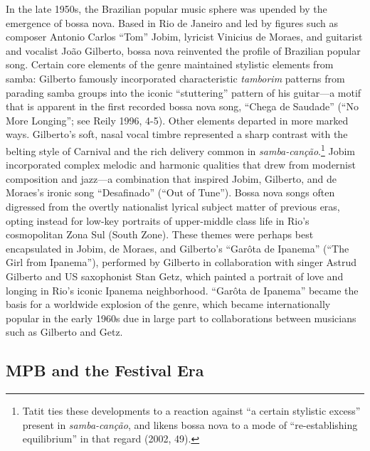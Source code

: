 \documentclass[twoside]{article}
\begin{document}
In the late 1950s, the Brazilian popular music sphere was upended by the
emergence of bossa nova. Based in Rio de Janeiro and led by figures such
as composer Antonio Carlos ``Tom'' Jobim, lyricist Vinicius de Moraes,
and guitarist and vocalist João Gilberto, bossa nova reinvented the
profile of Brazilian popular song. Certain core elements of the genre
maintained stylistic elements from samba: Gilberto famously incorporated
characteristic \emph{tamborim} patterns from parading samba groups into
the iconic ``stuttering'' pattern of his guitar---a motif that is
apparent in the first recorded bossa nova song, ``Chega de Saudade''
(``No More Longing''; see Reily 1996, 4-5). Other elements departed in
more marked ways. Gilberto's soft, nasal vocal timbre represented a
sharp contrast with the belting style of Carnival and the rich delivery
common in \emph{samba-canção}.\footnote{Tatit ties these developments to
  a reaction against ``a certain stylistic excess'' present in
  \emph{samba-canção}, and likens bossa nova to a mode of
  ``re-establishing equilibrium'' in that regard (2002, 49).} Jobim
incorporated complex melodic and harmonic qualities that drew from
modernist composition and jazz---a combination that inspired Jobim,
Gilberto, and de Moraes's ironic song ``Desafinado'' (``Out of Tune'').
Bossa nova songs often digressed from the overtly nationalist lyrical
subject matter of previous eras, opting instead for low-key portraits of
upper-middle class life in Rio's cosmopolitan Zona Sul (South Zone).
These themes were perhaps best encapsulated in Jobim, de Moraes, and
Gilberto's ``Garôta de Ipanema'' (``The Girl from Ipanema''), performed
by Gilberto in collaboration with singer Astrud Gilberto and US
saxophonist Stan Getz, which painted a portrait of love and longing in
Rio's iconic Ipanema neighborhood. ``Garôta de Ipanema'' became the
basis for a worldwide explosion of the genre, which became
internationally popular in the early 1960s due in large part to
collaborations between musicians such as Gilberto and Getz.

\hypertarget{mpb-and-the-festival-era}{%
\subsection*{MPB and the Festival Era}\label{mpb-and-the-festival-era}}
\end{document}
